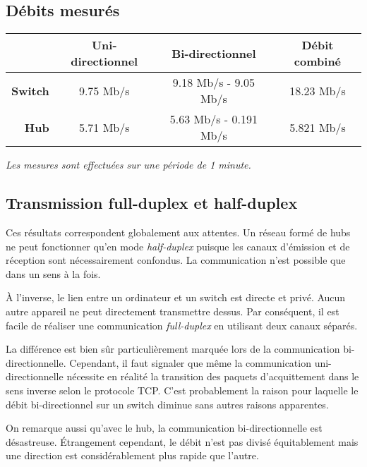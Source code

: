 \documentclass[11pt,a4paper]{article}
\begin{document}
\subsection{Débits mesurés}

\begin{tabular}{|r|c||c|c|}
	\hline
	& \textbf{Uni-directionnel} & \textbf{Bi-directionnel}  & \textbf{Débit combiné}\\
	\hline
	\textbf{Switch} & 9.75 Mb/s & 9.18 Mb/s - 9.05 Mb/s & 18.23 Mb/s \\
	\textbf{Hub} & 5.71 Mb/s & 5.63 Mb/s - 0.191  Mb/s & 5.821 Mb/s \\
	\hline
\end{tabular}

\textit{Les mesures sont effectuées sur une période de 1 minute.}

\subsection{Transmission full-duplex et half-duplex}

Ces résultats correspondent globalement aux attentes. Un réseau formé de hubs ne peut fonctionner qu'en mode \textit{half-duplex} puisque les canaux d'émission et de réception sont nécessairement confondus. La communication n'est possible que dans un sens à la fois.

À l'inverse, le lien entre un ordinateur et un switch est directe et privé. Aucun autre appareil ne peut directement transmettre dessus. Par conséquent, il est facile de réaliser une communication \textit{full-duplex} en utilisant deux canaux séparés.

La différence est bien sûr particulièrement marquée lors de la communication bi-directionnelle. Cependant, il faut signaler que même la communication uni-directionnelle nécessite en réalité la transition des paquets d'acquittement dans le sens inverse selon le protocole TCP. C'est probablement la raison pour laquelle le débit bi-directionnel sur un switch diminue sans autres raisons apparentes.

On remarque aussi qu'avec le hub, la communication bi-directionnelle est désastreuse. Étrangement cependant, le débit n'est pas divisé équitablement mais une direction est considérablement plus rapide que l'autre.
\end{document}
